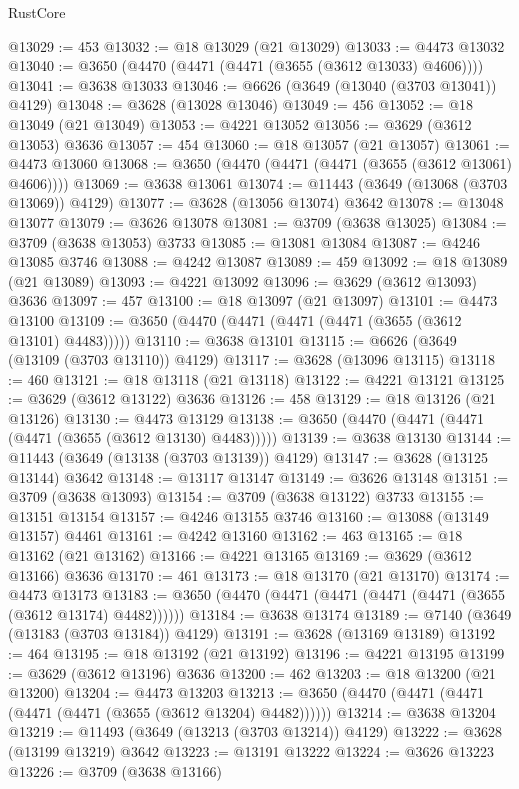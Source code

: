 \begin{lexlean}{RustCore}
\begin{coremodule}
@13029 := 453
@13032 := @18 @13029 (@21 @13029)
@13033 := @4473 @13032
@13040 := @3650 (@4470 (@4471 (@4471 (@3655 (@3612 @13033) @4606))))
@13041 := @3638 @13033
@13046 := @6626 (@3649 (@13040 (@3703 @13041)) @4129)
@13048 := @3628 (@13028 @13046)
@13049 := 456
@13052 := @18 @13049 (@21 @13049)
@13053 := @4221 @13052
@13056 := @3629 (@3612 @13053) @3636
@13057 := 454
@13060 := @18 @13057 (@21 @13057)
@13061 := @4473 @13060
@13068 := @3650 (@4470 (@4471 (@4471 (@3655 (@3612 @13061) @4606))))
@13069 := @3638 @13061
@13074 := @11443 (@3649 (@13068 (@3703 @13069)) @4129)
@13077 := @3628 (@13056 @13074) @3642
@13078 := @13048 @13077
@13079 := @3626 @13078
@13081 := @3709 (@3638 @13025)
@13084 := @3709 (@3638 @13053) @3733
@13085 := @13081 @13084
@13087 := @4246 @13085 @3746
@13088 := @4242 @13087
@13089 := 459
@13092 := @18 @13089 (@21 @13089)
@13093 := @4221 @13092
@13096 := @3629 (@3612 @13093) @3636
@13097 := 457
@13100 := @18 @13097 (@21 @13097)
@13101 := @4473 @13100
@13109 := @3650 (@4470 (@4471 (@4471 (@4471 (@3655 (@3612 @13101) @4483)))))
@13110 := @3638 @13101
@13115 := @6626 (@3649 (@13109 (@3703 @13110)) @4129)
@13117 := @3628 (@13096 @13115)
@13118 := 460
@13121 := @18 @13118 (@21 @13118)
@13122 := @4221 @13121
@13125 := @3629 (@3612 @13122) @3636
@13126 := 458
@13129 := @18 @13126 (@21 @13126)
@13130 := @4473 @13129
@13138 := @3650 (@4470 (@4471 (@4471 (@4471 (@3655 (@3612 @13130) @4483)))))
@13139 := @3638 @13130
@13144 := @11443 (@3649 (@13138 (@3703 @13139)) @4129)
@13147 := @3628 (@13125 @13144) @3642
@13148 := @13117 @13147
@13149 := @3626 @13148
@13151 := @3709 (@3638 @13093)
@13154 := @3709 (@3638 @13122) @3733
@13155 := @13151 @13154
@13157 := @4246 @13155 @3746
@13160 := @13088 (@13149 @13157) @4461
@13161 := @4242 @13160
@13162 := 463
@13165 := @18 @13162 (@21 @13162)
@13166 := @4221 @13165
@13169 := @3629 (@3612 @13166) @3636
@13170 := 461
@13173 := @18 @13170 (@21 @13170)
@13174 := @4473 @13173
@13183 := @3650 (@4470 (@4471 (@4471 (@4471 (@4471 (@3655 (@3612 @13174) @4482))))))
@13184 := @3638 @13174
@13189 := @7140 (@3649 (@13183 (@3703 @13184)) @4129)
@13191 := @3628 (@13169 @13189)
@13192 := 464
@13195 := @18 @13192 (@21 @13192)
@13196 := @4221 @13195
@13199 := @3629 (@3612 @13196) @3636
@13200 := 462
@13203 := @18 @13200 (@21 @13200)
@13204 := @4473 @13203
@13213 := @3650 (@4470 (@4471 (@4471 (@4471 (@4471 (@3655 (@3612 @13204) @4482))))))
@13214 := @3638 @13204
@13219 := @11493 (@3649 (@13213 (@3703 @13214)) @4129)
@13222 := @3628 (@13199 @13219) @3642
@13223 := @13191 @13222
@13224 := @3626 @13223
@13226 := @3709 (@3638 @13166)

\end{coremodule}
\end{lexlean}
